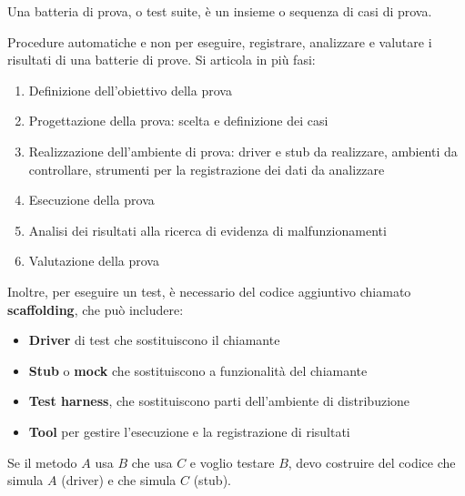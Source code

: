 \begin{definition}
	Una batteria di prova, o test suite, è un insieme o sequenza di casi di prova.
\end{definition}
\begin{definition}
	Procedure automatiche e non per eseguire, registrare, analizzare e valutare i risultati di una batterie di prove. Si articola in più fasi:
	\begin{enumerate}
		\item Definizione dell'obiettivo della prova
		\item Progettazione della prova: scelta e definizione dei casi
		\item Realizzazione dell'ambiente di prova: driver e stub da realizzare, ambienti da controllare, strumenti per la registrazione dei dati da analizzare
		\item Esecuzione della prova
		\item Analisi dei risultati alla ricerca di evidenza di malfunzionamenti
		\item Valutazione della prova
	\end{enumerate}
\end{definition}
\noindent Inoltre, per eseguire un test, è necessario del codice aggiuntivo chiamato \textbf{scaffolding}, che può includere:
\begin{itemize}
	\item \textbf{Driver} di test che sostituiscono il chiamante
	\item \textbf{Stub} o \textbf{mock} che sostituiscono a funzionalità del chiamante
	\item \textbf{Test harness}, che sostituiscono parti dell'ambiente di distribuzione
	\item \textbf{Tool} per gestire l'esecuzione e la registrazione di risultati
\end{itemize}
\begin{example}
	Se il metodo $A$ usa $B$ che usa $C$ e voglio testare $B$, devo costruire del codice che simula $A$ (driver) e che simula $C$ (stub).
\end{example}

